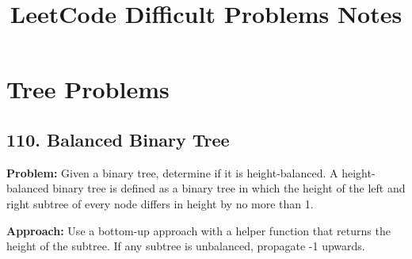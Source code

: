 \documentclass[11pt]{article}
\begin{document}
\title{\textbf{LeetCode Difficult Problems Notes}}
\author{}
\date{}
\maketitle

\tableofcontents
\newpage


\section{Tree Problems}

\subsection{110. Balanced Binary Tree}

\textbf{Problem:} Given a binary tree, determine if it is height-balanced. A height-balanced binary tree is defined as a binary tree in which the height of the left and right subtree of every node differs in height by no more than 1.

\textbf{Approach:} Use a bottom-up approach with a helper function that returns the height of the subtree. If any subtree is unbalanced, propagate -1 upwards.
\end{document}

